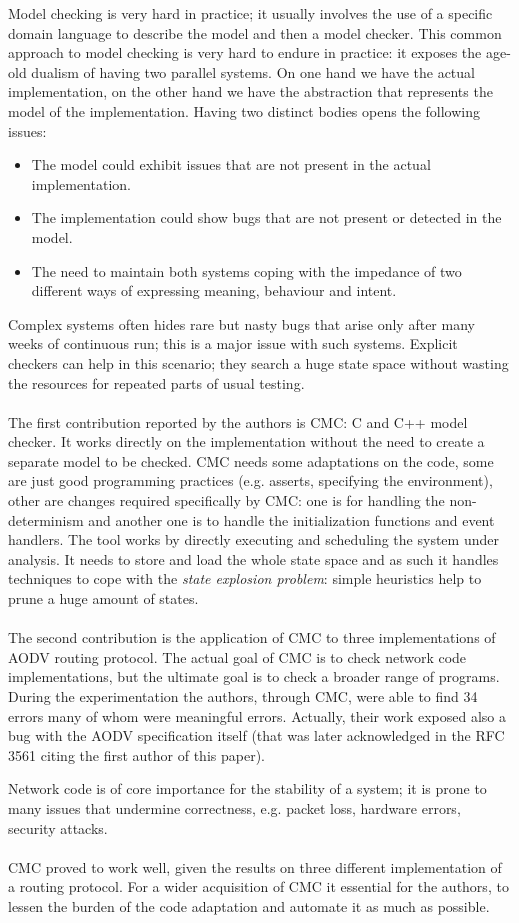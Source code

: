 Model checking is very hard in practice; it usually involves the use of a specific domain language to describe the model and then a model checker. This common approach to model checking is very hard to endure in practice: it exposes the age-old dualism of having two parallel systems.
On one hand we have the actual implementation, on the other hand we have the abstraction that represents the model of the implementation.
Having two distinct bodies opens the following issues:
\begin{itemize}
    \item The model could exhibit issues that are not present in the actual implementation.
    \item The implementation could show bugs that are not present or detected in the model.
    \item The need to maintain both systems coping with the impedance of two different ways of expressing meaning, behaviour and intent.
\end{itemize}


Complex systems often hides rare but nasty bugs that arise only after many weeks of continuous run; this is a major issue with such systems.
Explicit checkers can help in this scenario; they search a huge state space without wasting the resources for repeated parts of usual testing.
\\
\\
The first contribution reported by the authors is CMC: C and C++ model checker.
It works directly on the implementation without the need to create a separate model to be checked. CMC needs some adaptations on the code, some are just good programming practices (e.g. asserts, specifying the environment), other are changes required specifically by CMC: one is for handling the non-determinism and another one is to handle the initialization functions and event handlers.
The tool works by directly executing and scheduling the system under analysis. It needs to store and load the whole state space and as such it handles techniques to cope with the \textit{state explosion problem}: simple heuristics help to prune a huge amount of states.
\\
\\
The second contribution is the application of CMC to three implementations of AODV routing protocol. The actual goal of CMC is to check network code implementations, but the ultimate goal is to check a broader range of programs.
During the experimentation the authors, through CMC, were able to find 34 errors many of whom were meaningful errors. Actually, their work exposed also a bug with the AODV specification itself (that was later acknowledged in the RFC 3561 citing the first author of this paper).

Network code is of core importance for the stability of a system; it is prone to many issues that undermine correctness, e.g. packet loss, hardware errors, security attacks. 
\\
\\
CMC proved to work well, given the results on three different implementation of a routing protocol.
For a wider acquisition of CMC it essential for the authors, to lessen the burden of the code adaptation and automate it as much as possible.


